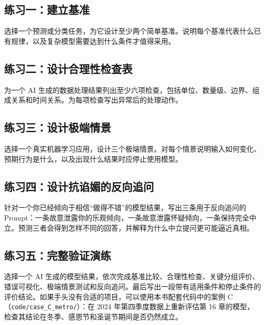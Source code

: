 \subsection*{练习一：建立基准}

选择一个预测或分类任务，为它设计至少两个简单基准。说明每个基准代表什么已有规律，以及复杂模型需要达到什么条件才值得采用。

\subsection*{练习二：设计合理性检查表}

为一个 AI 生成的数据处理结果列出至少六项检查，包括单位、数量级、边界、组成关系和时间关系。为每项检查写出异常后的处理动作。

\subsection*{练习三：设计极端情景}

选择一个真实机器学习应用，设计三个极端情景。对每个情景说明输入如何变化、预期行为是什么，以及出现什么结果时应停止使用模型。

\subsection*{练习四：设计抗谄媚的反向追问}

针对一个你已经倾向于相信“做得不错”的模型结果，写出三条用于反向追问的 Prompt：一条故意泄露你的乐观倾向，一条故意泄露怀疑倾向，一条保持完全中立。预测三者会得到怎样不同的回答，并解释为什么中立提问更可能逼近真相。

\subsection*{练习五：完整验证演练}

选择一个 AI 生成的模型结果，依次完成基准比较、合理性检查、关键分组评价、错误可视化、极端情景测试和反向追问。最后写出一段带有适用条件和停止条件的评价结论。如果手头没有合适的项目，可以使用本书配套代码中的案例 C（\texttt{code/case\_C\_metro/}）：在 2024 年第四季度数据上重新评估第 16 章的模型，检查其结论在冬季、感恩节和圣诞节期间是否仍然成立。
